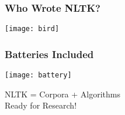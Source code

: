 \begin{frame}[fragile]\frametitle{Who Wrote NLTK?}
\begin{center}
\texttt{[image: bird]}
\end{center}
\end{frame}

\begin{frame}[fragile]\frametitle{Batteries Included}
\begin{center}
\texttt{[image: battery]}
\end{center}
NLTK = Corpora + Algorithms\\
Ready for Research!
\end{frame}


